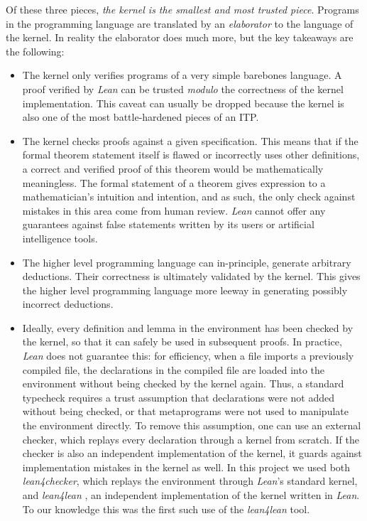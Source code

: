 Of these three pieces, \emph{the kernel is the smallest and most trusted piece}. Programs in the programming language are translated by an \emph{elaborator} to the language of the kernel. In reality the elaborator does much more, but the key takeaways are the following:
\begin{itemize}
    \item The kernel only verifies programs of a very simple barebones language. A proof verified by \emph{Lean} can be trusted \emph{modulo} the correctness of the kernel implementation. This caveat can usually be dropped because the kernel is also one of the most battle-hardened pieces of an ITP.
    \item The kernel checks proofs against a given specification. This means that if the formal theorem statement itself is flawed or incorrectly uses other definitions, a correct and verified proof of this theorem would be mathematically meaningless. The formal statement of a theorem gives expression to a mathematician's intuition and intention, and as such, the only check against mistakes in this area come from human review. \emph{Lean} cannot offer any guarantees against false statements written by its users or artificial intelligence tools.
    \item The higher level programming language can in-principle, generate arbitrary deductions. Their correctness is ultimately validated by the kernel. This gives the higher level programming language more leeway in generating possibly incorrect deductions.
    \item Ideally, every definition and lemma in the environment has been checked by the kernel, so that it can safely be used in subsequent proofs. In practice, \emph{Lean} does not guarantee this: for efficiency, when a file imports a previously compiled file, the declarations in the compiled file are loaded into the environment without being checked by the kernel again. Thus, a standard typecheck requires a trust assumption that  declarations were not added without being checked, or that metaprograms were not used to manipulate the environment directly. To remove this assumption, one can use an external checker, which replays every declaration through a kernel from scratch. If the checker is also an independent implementation of the kernel, it guards against implementation mistakes in the kernel as well. In this project we used both \textit{lean4checker}, which replays the environment through \emph{Lean}'s standard kernel, and \textit{lean4lean} \cite{lean4lean}, an independent implementation of the kernel written in \emph{Lean}. To our knowledge this was the first such use of the \textit{lean4lean} tool.

\end{itemize}

